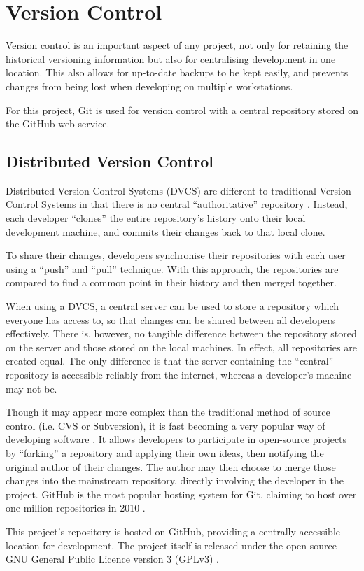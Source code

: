 \section{Version Control}
\label{sec:implementation-versioncontrol}

Version control is an important aspect of any project, not only for retaining
the historical versioning information but also for centralising development in
one location. This also allows for up-to-date backups to be kept easily, and
prevents changes from being lost when developing on multiple workstations.

For this project, Git is used for version control with a central repository
stored on the GitHub web service.

\subsection{Distributed Version Control}

Distributed Version Control Systems (DVCS) are different to traditional Version
Control Systems in that there is no central ``authoritative'' repository
\cite{robert2006}. Instead, each developer ``clones'' the entire repository's
history onto their local development machine, and commits their changes back to
that local clone.

To share their changes, developers synchronise their repositories with each
user using a ``push'' and ``pull'' technique. With this approach, the
repositories are compared to find a common point in their history and then
merged together.

When using a DVCS, a central server can be used to store a repository which
everyone has access to, so that changes can be shared between all developers
effectively. There is, however, no tangible difference between the repository
stored on the server and those stored on the local machines. In effect, all
repositories are created equal. The only difference is that the server
containing the ``central'' repository is accessible reliably from the internet,
whereas a developer's machine may not be.

Though it may appear more complex than the traditional method of source control
(i.e. CVS or Subversion), it is fast becoming a very popular way of developing
software \cite{takhteyev2010}. It allows developers to participate in
open-source projects by ``forking'' a repository and applying their own ideas,
then notifying the original author of their changes. The author may then choose
to merge those changes into the mainstream repository, directly involving the
developer in the project. GitHub \cite{Github} is the most popular hosting
system for Git, claiming to host over one million repositories in 2010
\cite{takhteyev2010}.

This project's repository is hosted on GitHub, providing a centrally accessible
location for development. The project itself is released under the open-source
GNU General Public Licence version 3 (GPLv3) \cite{stallman1991}.

